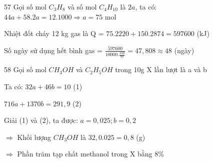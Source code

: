 \def\writeANS{}
\begin{loigiaibth}{57}
  Gọi số mol $C_3H_8$ và số mol $C_4H_{10}$ là $2a$, ta có: $44a + 58.2a = 12.1000 \Rightarrow a = 75$ mol \par Nhiệt đốt cháy 12 kg gas là Q = $75.2220 + 150.2874 = 597600$ (kJ) \par Số ngày sử dụng hết bình gas = $\frac {597600}{10000.\frac {100}{80}} = 47{,}808 \approx 48$ (ngày)
\end{loigiaibth}
\def\writeANS{}
\begin{loigiaibth}{58}
  Gọi số mol $CH_3OH$ và $C_2H_5OH$ trong 10g X lần lượt là a và b \par Ta có: $32a + 46b = 10$ (1) \par $716a + 1370b = 291{,}9$ (2) \par Giải (1) và (2), ta được: $a = 0{,}025; b = 0{,}2$ \par $\Rightarrow $ Khối lượng $CH_3OH$ là $32{,}0.025 = 0{,}8$ (g) \par $\Rightarrow $ Phần trăm tạp chất methanol trong X bằng $8\%$
\end{loigiaibth}
